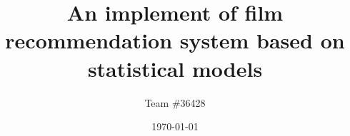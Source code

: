 \documentclass[a4paper,11pt]{article}
\title{An implement of film recommendation system based on statistical models}
\author{Team \#36428}
\date{\today}
\begin{document}
   
\def\abstractname{Abstract}%
\begin{abstract}
  
\begin{keywords}
\end{keywords}
\end{abstract}

\maketitle
\pagestyle{empty}
%
\newpage                                                          %


\tableofcontents                                                  %
\newpage
\pagestyle{fancy}                                                     %

\end{document}

